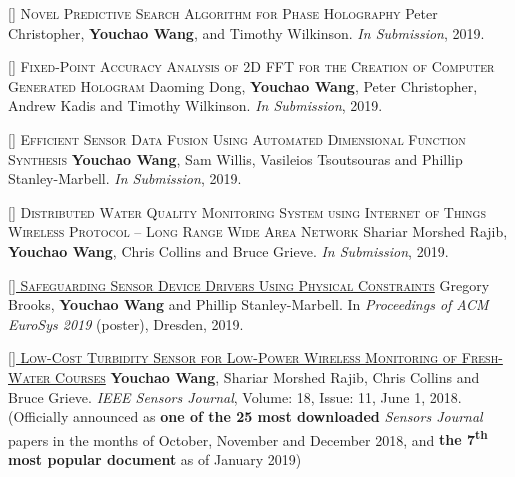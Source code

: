 \documentclass[11pt,a4paper]{moderncv}
\begin{document}
\addtocounter{counter}{1}

\textsc{[] Novel Predictive Search Algorithm for Phase Holography}
\newline Peter Christopher, \textbf{Youchao Wang}, and Timothy Wilkinson. \textit{In Submission}, 2019.

\addtocounter{counter}{1}

\textsc{[] Fixed-Point Accuracy Analysis of 2D FFT for the Creation of Computer Generated Hologram}
\newline  Daoming Dong, \textbf{Youchao Wang}, Peter Christopher, Andrew Kadis and Timothy Wilkinson. \textit{In Submission}, 2019.

\addtocounter{counter}{1}

\textsc{[] Efficient Sensor Data Fusion Using Automated Dimensional Function Synthesis}
\newline  \textbf{Youchao Wang}, Sam Willis, Vasileios Tsoutsouras and Phillip Stanley-Marbell. \textit{In Submission}, 2019.

\addtocounter{counter}{1}

\textsc{[] Distributed Water Quality Monitoring System using Internet of Things Wireless Protocol – Long Range Wide Area Network}
\newline  Shariar Morshed Rajib, \textbf{Youchao Wang}, Chris Collins and Bruce Grieve. \textit{In Submission}, 2019.

\addtocounter{counter}{1}

\href{https://www.eurosys2019.org/wp-content/uploads/2019/03/eurosys19posters-abstract77.pdf}{\textsc{[] Safeguarding Sensor Device Drivers Using Physical Constraints}}
\newline  Gregory Brooks, \textbf{Youchao Wang} and Phillip Stanley-Marbell. In \textit{Proceedings of ACM EuroSys 2019} (poster), Dresden, 2019.

\addtocounter{counter}{1}

\href{https://ieeexplore.ieee.org/document/8337739}{\textsc{[] Low-Cost Turbidity Sensor for Low-Power Wireless Monitoring of Fresh-Water Courses}}
\newline  \textbf{Youchao Wang}, Shariar Morshed Rajib, Chris Collins and Bruce Grieve. \textit{IEEE Sensors Journal}, Volume: 18, Issue: 11, June 1, 2018. (Officially announced as \textbf{one of the 25 most downloaded} \textit{Sensors Journal} papers in the months of October, November and December 2018, and \textbf{the 7\textsuperscript{th} most popular document} as of January 2019)
\end{document}
